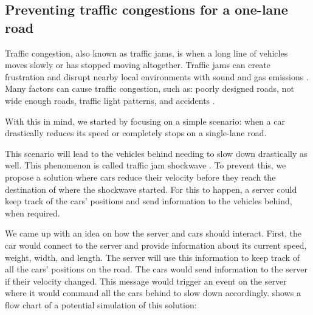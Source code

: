 \subsection{Preventing traffic congestions for a one-lane road}\label{sec:traffic_congestion}

Traffic congestion, also known as traffic jams, is when a long line of vehicles moves slowly or has stopped moving altogether. Traffic jams can create frustration and disrupt nearby local environments with sound and gas emissions \parencite{traffic_congestion_pollution}. Many factors can cause traffic congestion, such as: poorly designed roads, not wide enough roads, traffic light patterns, and accidents \parencite{traffic_congestion}.

With this in mind, we started by focusing on a simple scenario: when a car drastically reduces its speed or completely stops on a single-lane road.

This scenario will lead to the vehicles behind needing to slow down drastically as well. This phenomenon is called traffic jam shockwave \parencite{traffic_shockwave}. To prevent this, we propose a solution where cars reduce their velocity before they reach the destination of where the shockwave started. For this to happen, a server could keep track of the cars' positions and send information to the vehicles behind, when required. 

We came up with an idea on how the server and cars should interact. First, the car would connect to the server and provide information about its current speed, weight, width, and length. The server will use this information to keep track of all the cars' positions on the road. The cars would send information to the server if their velocity changed. This message would trigger an event on the server where it would command all the cars behind to slow down accordingly.  shows a flow chart of a potential simulation of this solution:

